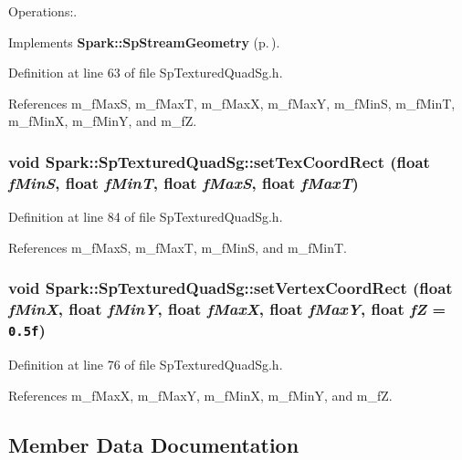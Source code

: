 Operations:. 



Implements {\bf Spark::Sp\-Stream\-Geometry} {\rm (p.\,\pageref{classSpark_1_1SpStreamGeometry_a0})}.

Definition at line 63 of file Sp\-Textured\-Quad\-Sg.h.

References m\_\-f\-Max\-S, m\_\-f\-Max\-T, m\_\-f\-Max\-X, m\_\-f\-Max\-Y, m\_\-f\-Min\-S, m\_\-f\-Min\-T, m\_\-f\-Min\-X, m\_\-f\-Min\-Y, and m\_\-f\-Z.
\subsubsection{\setlength{\rightskip}{0pt plus 5cm}void Spark::Sp\-Textured\-Quad\-Sg::set\-Tex\-Coord\-Rect (float {\em f\-Min\-S}, float {\em f\-Min\-T}, float {\em f\-Max\-S}, float {\em f\-Max\-T})\hspace{0.3cm}{\tt  [inline]}}\label{classSpark_1_1SpTexturedQuadSg_a4}


Definition at line 84 of file Sp\-Textured\-Quad\-Sg.h.

References m\_\-f\-Max\-S, m\_\-f\-Max\-T, m\_\-f\-Min\-S, and m\_\-f\-Min\-T.
\subsubsection{\setlength{\rightskip}{0pt plus 5cm}void Spark::Sp\-Textured\-Quad\-Sg::set\-Vertex\-Coord\-Rect (float {\em f\-Min\-X}, float {\em f\-Min\-Y}, float {\em f\-Max\-X}, float {\em f\-Max\-Y}, float {\em f\-Z} = {\tt 0.5f})\hspace{0.3cm}{\tt  [inline]}}\label{classSpark_1_1SpTexturedQuadSg_a3}


Definition at line 76 of file Sp\-Textured\-Quad\-Sg.h.

References m\_\-f\-Max\-X, m\_\-f\-Max\-Y, m\_\-f\-Min\-X, m\_\-f\-Min\-Y, and m\_\-f\-Z.

\subsection{Member Data Documentation}
